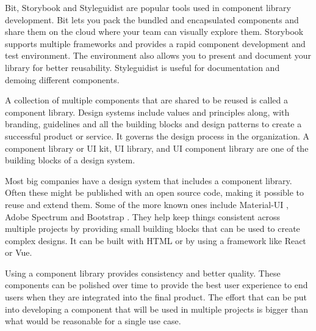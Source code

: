 \documentclass{master_thesis}
\begin{document}
Bit, Storybook and Styleguidist are popular tools used in component library development. Bit lets you pack the bundled and encapsulated components and share them on the cloud where your team can visually explore them. Storybook supports multiple frameworks and provides a rapid component development and test environment. The environment also allows you to present and document your library for better reusability. Styleguidist is useful for documentation and demoing different components. \citep{Ella2019}

A collection of multiple components that are shared to be reused is called a component library. Design systems include values and principles along, with branding, guidelines and all the building blocks and design patterns to create a successful product or service. It governs the design process in the organization. A component library or UI kit, UI library, and UI component library are one of the building blocks of a design system. \citep{Ramotion2022}

Most big companies have a design system that includes a component library. Often these might be published with an open source code, making it possible to reuse and extend them. Some of the more known ones include Material-UI \citep{MUS}, Adobe Spectrum \citep{Adobe} and Bootstrap \citep{Collings}. They help keep things consistent across multiple projects by providing small building blocks that can be used to create complex designs.  It can be built with HTML or by using a framework like React or Vue.

Using a component library provides consistency and better quality. These components can be polished over time to provide the best user experience to end users when they are integrated into the final product. The effort that can be put into developing a component that will be used in multiple projects is bigger than what would be reasonable for a single use case.
\end{document}
